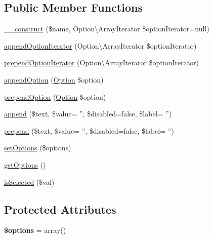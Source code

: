 \subsection*{Public Member Functions}
\begin{DoxyCompactItemize}
\item 
\hyperlink{classTk_1_1Form_1_1Field_1_1SelectList_a523a07af462483fbbb63f3aaa56042e7}{\+\_\+\+\_\+construct} (\$name, Option\textbackslash{}\+Array\+Iterator \$option\+Iterator=null)
\item 
\hyperlink{classTk_1_1Form_1_1Field_1_1SelectList_a9180e1a6b940a5f2cab38511c16c66eb}{append\+Option\+Iterator} (Option\textbackslash{}\+Array\+Iterator \$option\+Iterator)
\item 
\hyperlink{classTk_1_1Form_1_1Field_1_1SelectList_a55e2d1b556ec4252c6744a003d80133c}{prepend\+Option\+Iterator} (Option\textbackslash{}\+Array\+Iterator \$option\+Iterator)
\item 
\hyperlink{classTk_1_1Form_1_1Field_1_1SelectList_a0593afc7e1339703ca041b5703eaf870}{append\+Option} (\hyperlink{classTk_1_1Form_1_1Field_1_1Option}{Option} \$option)
\item 
\hyperlink{classTk_1_1Form_1_1Field_1_1SelectList_aecd195cfba7f610261c890246c381118}{prepend\+Option} (\hyperlink{classTk_1_1Form_1_1Field_1_1Option}{Option} \$option)
\item 
\hyperlink{classTk_1_1Form_1_1Field_1_1SelectList_a2e5870d2c58dbc11049b5a0c75998467}{append} (\$text, \$value= '', \$disabled=false, \$label= '')
\item 
\hyperlink{classTk_1_1Form_1_1Field_1_1SelectList_a0716b9b67360f8708806b67ec5ee18f3}{prepend} (\$text, \$value= '', \$disabled=false, \$label= '')
\item 
\hyperlink{classTk_1_1Form_1_1Field_1_1SelectList_a8b9499d2b1ae066a1f74cf8d4346fcca}{set\+Options} (\$options)
\item 
\hyperlink{classTk_1_1Form_1_1Field_1_1SelectList_a6dbf6f9962d9674faa301e115cf30921}{get\+Options} ()
\item 
\hyperlink{classTk_1_1Form_1_1Field_1_1SelectList_a164a4a4a48e8986e8e2093026a873b89}{is\+Selected} (\$val)
\end{DoxyCompactItemize}
\subsection*{Protected Attributes}
\begin{DoxyCompactItemize}
\item 
\hypertarget{classTk_1_1Form_1_1Field_1_1SelectList_aad1d9e63565cfaa9a6118a097d579949}{{\bfseries \$options} = array()}\label{classTk_1_1Form_1_1Field_1_1SelectList_aad1d9e63565cfaa9a6118a097d579949}

\end{DoxyCompactItemize}
